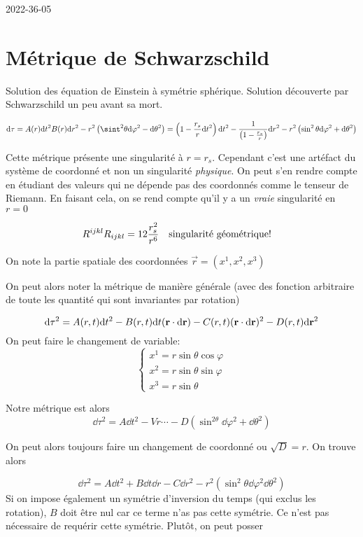 


2022-36-05

\section*{Métrique de Schwarzschild}

Solution des équation de Einstein à symétrie sphérique. Solution découverte par Schwarzschild un peu avant sa mort.

$$\dd \tau = A(r) \dd t^{2} B(r) \dd r^{2}- r^{2}\left( \sint^2\theta \dd \varphi^{2}-\dd \theta ^2 \right)= \left( 1 - \frac{r_s}{r} \dd t^{2} \right) \dd t^{2}- \frac{1}{\left( 1 - \frac{r_s}{r}  \right)} \dd r^2  -r^{2}\left( \sin^2\theta \dd \varphi	^2 + \dd \theta ^2 \right)   $$ 

Cette métrique présente une singularité à $r = r_s $. Cependant c'est une artéfact du système de coordonné et non un singularité \textit{physique}. On peut s'en rendre compte en étudiant des valeurs qui ne dépende pas des coordonnés comme le tenseur de Riemann. En faisant cela, on se rend compte qu'il y a un \textit{vraie} singularité en $r=0$  

$$R^{ijkl}R_{ijkl} = 12 \frac{r_s^{2}}{r^{6}} \qq{singularité géométrique!}$$ 

\begin{tcolorbox}[title=]
	On note la partie spatiale des coordonnées $\vec r = ( x^{1}, x^{2}, x^{3} )$  
\end{tcolorbox}

On peut alors noter la métrique de manière générale (avec des fonction arbitraire de toute les quantité qui sont invariantes par rotation)

$$\dd \tau^{2}= A(r,t) \dd t^{2}- B(r,t ) \dd t (\vb{r} \cdot  \dd \vb{r}) - C(r,t)(\vb{r}\cdot \dd \vb{r})^2 -D(r,t) \dd \vb{r}^2$$ 
On peut faire le changement de variable:
$$\begin{cases}
	x^{1} = r\sin\theta\cos\varphi\\
	x^{2}= r\sin\theta \sin\varphi\\
	x^{3}= r\sin\theta
\end{cases}$$  

Notre métrique est alors
$$\dd \tau^{2}= A\dd t^{2}- V r \dotsb -D\left( \sin^{2\theta}\dd \varphi^{2}+ \dd \theta^2 \right) $$ 

On peut alors toujours faire un changement de coordonné ou $\sqrt{D} =r$. On trouve alors

$$\dd \tau^{2}= A \dd t^{2} + B \dd t \dd r - C \dd r^{2} -r^{2}\left( \sin^2\theta \dd \varphi^{2}\dd \theta^{2} \right) $$ 
Si on impose également un symétrie d'inversion du temps (qui exclus les rotation), $B$ doit être nul car ce terme n'as pas cette symétrie. Ce n'est pas nécessaire de requérir cette symétrie. Plutôt, on peut posser

